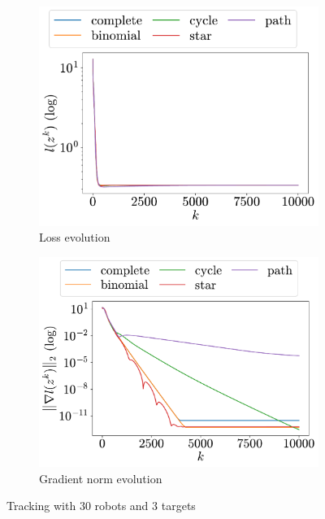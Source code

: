\documentclass[a4paper,11pt,oneside]{book}
\begin{document}
\begin{figure}[H]
      \centering
      \begin{subfigure}[t]{0.48\linewidth}
            \centering
            \includegraphics[width=\linewidth]{./figs/tracking/30_3_2/loss.pdf} 
            \caption{Loss evolution}
      \end{subfigure}
      \hfill
      \begin{subfigure}[t]{0.48\linewidth}
            \centering
            \includegraphics[width=\linewidth]{./figs/tracking/30_3_2/gradient.pdf} 
            \caption{Gradient norm evolution}
      \end{subfigure}
      \caption{Tracking with $30$ robots and $3$ targets}
      \label{fig:tracking_30_3}
\end{figure}
\end{document}
